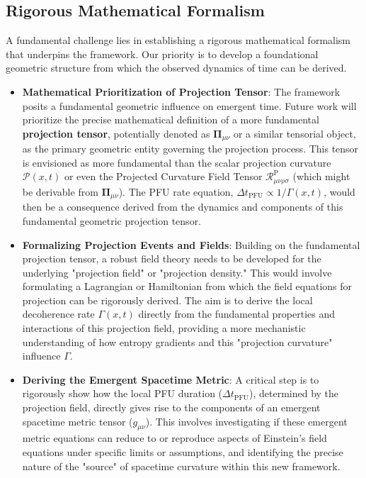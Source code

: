 \documentclass[12pt,a4paper]{article}
\numberwithin{equation}{section}
\begin{document}
\subsection{Rigorous Mathematical Formalism}
A fundamental challenge lies in establishing a rigorous mathematical formalism that underpins the framework. Our priority is to develop a foundational geometric structure from which the observed dynamics of time can be derived.
\begin{itemize}
    \item \textbf{Mathematical Prioritization of Projection Tensor}: The framework posits a fundamental geometric influence on emergent time. Future work will prioritize the precise mathematical definition of a more fundamental \textbf{projection tensor}, potentially denoted as $\mathbf{\Pi}_{\mu\nu}$ or a similar tensorial object, as the primary geometric entity governing the projection process. This tensor is envisioned as more fundamental than the scalar projection curvature $\mathcal{P}(x,t)$ or even the Projected Curvature Field Tensor $\mathcal{R}_{\mu\nu\rho\sigma}^{\text{P}}$ (which might be derivable from $\mathbf{\Pi}_{\mu\nu}$). The PFU rate equation, $\Delta t_{\text{PFU}} \propto 1/\Gamma(x, t)$, would then be a consequence derived from the dynamics and components of this fundamental geometric projection tensor.
    \item \textbf{Formalizing Projection Events and Fields}: Building on the fundamental projection tensor, a robust field theory needs to be developed for the underlying "projection field" or "projection density." This would involve formulating a Lagrangian or Hamiltonian from which the field equations for projection can be rigorously derived. The aim is to derive the local decoherence rate $\Gamma(x,t)$ directly from the fundamental properties and interactions of this projection field, providing a more mechanistic understanding of how entropy gradients and this "projection curvature" influence $\Gamma$.
    \item \textbf{Deriving the Emergent Spacetime Metric}: A critical step is to rigorously show how the local PFU duration ($\Delta t_{\text{PFU}}$), determined by the projection field, directly gives rise to the components of an emergent spacetime metric tensor ($g_{\mu\nu}$). This involves investigating if these emergent metric equations can reduce to or reproduce aspects of Einstein's field equations under specific limits or assumptions, and identifying the precise nature of the "source" of spacetime curvature within this new framework.
\end{itemize}
\end{document}
